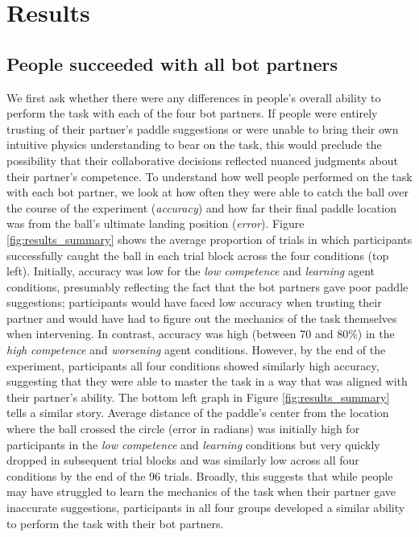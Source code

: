 \documentclass[10pt,letterpaper]{article}
\begin{document}
\section{Results}

\subsection{People succeeded with all bot partners}

We first ask whether there were any differences in people's overall ability to perform the task with each of the four bot partners. If people were entirely trusting of their partner's paddle suggestions or were unable to bring their own intuitive physics understanding to bear on the task, this would preclude the possibility that their collaborative decisions reflected nuanced judgments about their partner's competence. To understand how well people performed on the task with each bot partner, we look at how often they were able to catch the ball over the course of the experiment (\textit{accuracy}) and how far their final paddle location was from the ball's ultimate landing position (\textit{error}). Figure \ref{fig:results_summary} shows the average proportion of trials in which participants successfully caught the ball in each trial block across the four conditions (top left). Initially, accuracy was low for the \textit{low competence} and \textit{learning} agent conditions, presumably reflecting the fact that the bot partners gave poor paddle suggestions; participants would have faced low accuracy when trusting their partner and would have had to figure out the mechanics of the task themselves when intervening. In contrast, accuracy was high (between 70 and 80\%) in the \textit{high competence} and \textit{worsening} agent conditions. However, by the end of the experiment, participants all four conditions showed similarly high accuracy, suggesting that they were able to master the task in a way that was aligned with their partner's ability. The bottom left graph in Figure \ref{fig:results_summary} tells a similar story. Average distance of the paddle's center from the location where the ball crossed the circle (error in radians) was initially high for participants in the \textit{low competence} and \textit{learning} conditions but very quickly dropped in subsequent trial blocks and was similarly low across all four conditions by the end of the 96 trials. Broadly, this suggests that while people may have struggled to learn the mechanics of the task when their partner gave inaccurate suggestions, participants in all four groups developed a similar ability to perform the task with their bot partners. 
\end{document}
